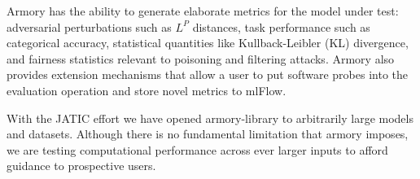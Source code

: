 \documentclass[letterpaper]{article}
\begin{document}
Armory has the ability to generate elaborate metrics for the model under test:
adversarial perturbations such as $L^P$ distances, task performance such as categorical
accuracy, statistical quantities like Kullback-Leibler (KL) divergence, and fairness
statistics relevant to poisoning and filtering attacks. Armory also provides extension
mechanisms that allow a user to put software probes into the evaluation operation and
store novel metrics to mlFlow.

With the JATIC effort we have opened armory-library to arbitrarily large models
and datasets. Although there is no fundamental limitation that armory imposes,
we are testing computational performance across ever larger inputs to afford
guidance to prospective users.




\end{document}
